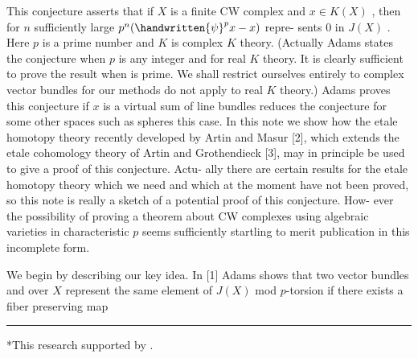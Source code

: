 This conjecture asserts that if $X$ is a finite CW complex
and $x \in K(X)$ , then for $n$ sufficiently large $p^{n}(\handwritten{\psi}^{p}x - x)$ repre-%
sents $0$ in $J(X)$ . Here $p$ is a prime number and $K$ is complex
$K$ theory. (Actually Adams states the conjecture when $p$ is any
integer and for real $K$ theory. It is clearly sufficient to prove
the result when  is prime. We shall restrict ourselves entirely
to complex vector bundles for our methods do not apply to real $K$
theory.) Adams \handwritten{[1]} proves this conjecture if $x$ is a virtual sum
of line bundles  reduces the conjecture for some other spaces
such as spheres  this case. In this note we show how the etale
homotopy theory recently developed by Artin and Masur [2], which
extends the etale cohomology theory of Artin and Grothendieck [3],
may in principle be used to give a proof of this conjecture. Actu-%
ally there are certain results for the etale homotopy theory which
we need and which at the moment have not been proved, so this note
is really a sketch of a potential proof of this conjecture. How-%
ever the possibility of proving a theorem about CW complexes
using algebraic varieties in characteristic $p$ seems sufficiently
startling to merit publication in this incomplete form.

We begin by describing our key idea. In [1] Adams shows that
two vector bundles  and  over $X$ represent the same element
of $J(X)$ mod $p$-torsion if there exists a fiber preserving map

\noindent\rule{0.4\textwidth}{0.4pt}

*This research  supported  by 
 .


